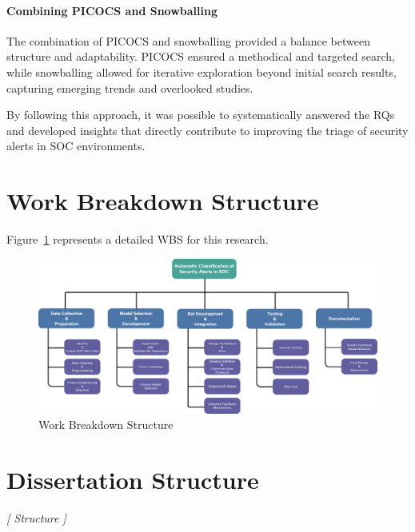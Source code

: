 \paragraph{Combining PICOCS and Snowballing} The combination of PICOCS and snowballing provided a balance between structure and adaptability. 
PICOCS ensured a methodical and targeted search, while snowballing allowed for iterative exploration beyond initial search results, capturing emerging trends and overlooked studies.

By following this approach, it was possible to systematically answered the RQs and developed insights that directly contribute to improving the triage of security alerts in SOC environments.

\section{Work Breakdown Structure}

Figure~\ref{fig:wbs-image} represents a detailed WBS for this research.

\clearpage

\begin{figure}[htp]
    \centering
    \includegraphics[scale=0.18, angle=270]{ch1/assets/WBS.png}
    \caption{Work Breakdown Structure}
    \label{fig:wbs-image} 
\end{figure}

\clearpage


\section{Dissertation Structure}

\textit{
    [ 
        Structure
    ]
}

%